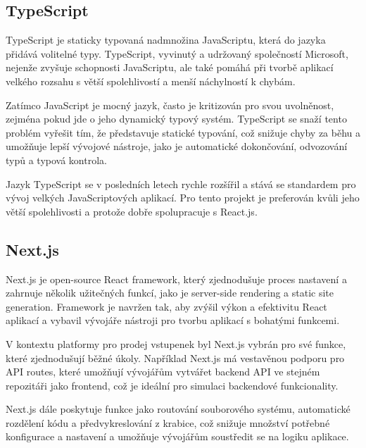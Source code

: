 \subsection{TypeScript}
\label{subsec:implementace-techologie-typescript}
TypeScript je staticky typovaná nadmnožina JavaScriptu, která do jazyka přidává volitelné typy.
TypeScript, vyvinutý a udržovaný společností Microsoft, nejenže zvyšuje schopnosti JavaScriptu, ale také pomáhá při tvorbě aplikací velkého rozsahu s větší spolehlivostí a menší náchylností k chybám.

Zatímco JavaScript je mocný jazyk, často je kritizován pro svou uvolněnost, zejména pokud jde o jeho dynamický typový systém.
TypeScript se snaží tento problém vyřešit tím, že představuje statické typování, což snižuje chyby za běhu a umožňuje lepší vývojové nástroje, jako je automatické dokončování, odvozování typů a typová kontrola.

Jazyk TypeScript se v posledních letech rychle rozšířil a stává se standardem pro vývoj velkých JavaScriptových aplikací.
Pro tento projekt je preferován kvůli jeho větší spolehlivosti a protože dobře spolupracuje s React.js.

\subsection{Next.js}
\label{subsec:implementace-techologie-nextjs}
Next.js je open-source React framework, který zjednodušuje proces nastavení a zahrnuje několik užitečných funkcí, jako je server-side rendering a static site generation.
Framework je navržen tak, aby zvýšil výkon a efektivitu React aplikací a vybavil vývojáře nástroji pro tvorbu aplikací s bohatými funkcemi.

V kontextu platformy pro prodej vstupenek byl Next.js vybrán pro své funkce, které zjednodušují běžné úkoly.
Například Next.js má vestavěnou podporu pro API routes, které umožňují vývojářům vytvářet backend API ve stejném repozitáři jako frontend, což je ideální pro simulaci backendové funkcionality.

Next.js dále poskytuje funkce jako routování souborového systému, automatické rozdělení kódu a předvykreslování z krabice, což snižuje množství potřebné konfigurace a nastavení a umožňuje vývojářům soustředit se na logiku aplikace.

